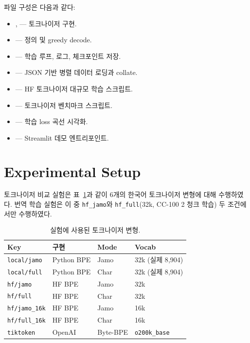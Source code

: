 \documentclass[sigconf,nonacm]{acmart}
\begin{document}
파일 구성은 다음과 같다:
\begin{itemize}
    \item {},  — 토크나이저 구현.
    \item {} —  정의 및 greedy decode.
    \item {} — 학습 루프, 로그, 체크포인트 저장.
    \item {} — JSON 기반 병렬 데이터 로딩과 collate.
    \item {} — HF 토크나이저 대규모 학습 스크립트.
    \item {} — 토크나이저 벤치마크 스크립트.
    \item {} — 학습 loss 곡선 시각화.
    \item {} — Streamlit 데모 엔트리포인트.
\end{itemize}

\section{Experimental Setup}
\label{sec:setup}

토크나이저 비교 실험은 표~\ref{tab:setup}과 같이 6개의 한국어 토크나이저 변형에 대해 수행하였다.
번역 학습 실험은 이 중 \texttt{hf\_jamo}와 \texttt{hf\_full}(32k, CC-100 2 청크 학습) 두 조건에서만
수행하였다.

\begin{table}[h]
\caption{실험에 사용된 토크나이저 변형.}
\label{tab:setup}
\small
\begin{tabular}{llll}
\toprule
Key & 구현 & Mode & Vocab \\
\midrule
\texttt{local/jamo}      & Python BPE & Jamo & 32k (실제 8{,}904) \\
\texttt{local/full}      & Python BPE & Char & 32k (실제 8{,}904) \\
\texttt{hf/jamo}         & HF BPE     & Jamo & 32k \\
\texttt{hf/full}         & HF BPE     & Char & 32k \\
\texttt{hf/jamo\_16k}    & HF BPE     & Jamo & 16k \\
\texttt{hf/full\_16k}    & HF BPE     & Char & 16k \\
\texttt{tiktoken}        & OpenAI     & Byte-BPE & \texttt{o200k\_base} \\
\bottomrule
\end{tabular}
\end{table}
\end{document}
